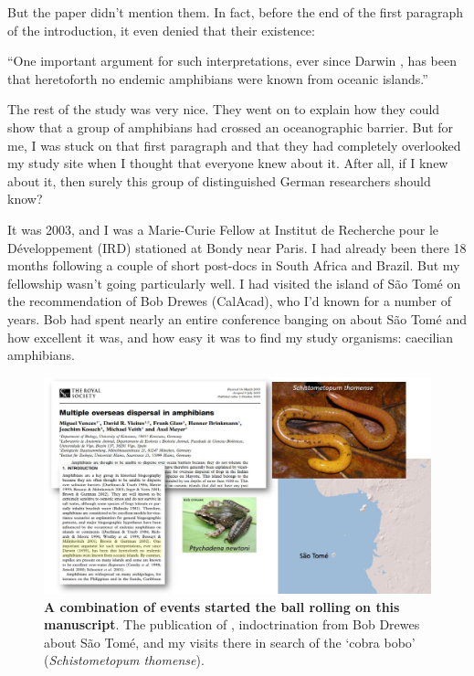 \documentclass[
]{krantz}
\renewenvironment{quote}{\begin{VF}}{\end{VF}}
\begin{document}
But the paper didn't mention them. In fact, before the end of the first paragraph of the introduction, it even denied that their existence:

\begin{quote}
``One important argument for such interpretations, ever since Darwin \citeyearpar{darwin1859origin}, has been that heretoforth no endemic amphibians were known from oceanic islands.''

\end{quote}

The rest of the study was very nice. They went on to explain how they could show that a group of amphibians had crossed an oceanographic barrier. But for me, I was stuck on that first paragraph and that they had completely overlooked my study site when I thought that everyone knew about it. After all, if I knew about it, then surely this group of distinguished German researchers should know?

It was 2003, and I was a Marie-Curie Fellow at Institut de Recherche pour le Développement (IRD) stationed at Bondy near Paris. I had already been there 18 months following a couple of short post-docs in South Africa and Brazil. But my fellowship wasn't going particularly well. I had visited the island of São Tomé on the recommendation of Bob Drewes (CalAcad), who I'd known for a number of years. Bob had spent nearly an entire conference banging on about São Tomé and how excellent it was, and how easy it was to find my study organisms: caecilian amphibians.



\begin{figure}
\includegraphics[width=0.85\linewidth]{figures/freshwater-paths} \caption{\textbf{A combination of events started the ball rolling on this manuscript}. The publication of \citet{vences2003multiple}, indoctrination from Bob Drewes about São Tomé, and my visits there in search of the `cobra bobo' (\emph{Schistometopum thomense}).}\label{fig:freshwater-paths}
\end{figure}
\end{document}
